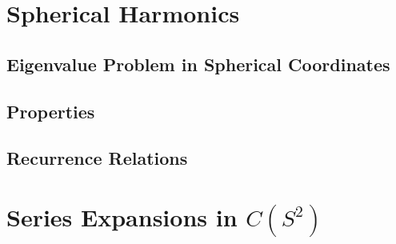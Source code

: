 
\section{Spherical Harmonics}

\subsection{Eigenvalue Problem in Spherical Coordinates}

\subsection{Properties}

\subsection{Recurrence Relations}

\section{Series Expansions in \(C(S^2)\)}

\nocite{olver_introduction_2013}
